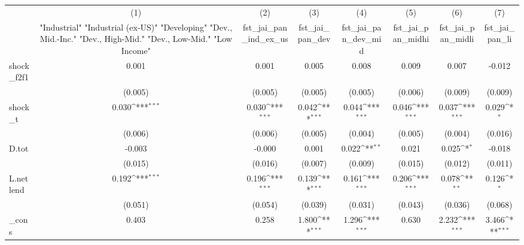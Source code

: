 {
\def\sym#1{\ifmmode^{#1}\else\(^{#1}\)\fi}
\begin{tabular}{l*{7}{c}}
\toprule
            &\multicolumn{1}{c}{(1)}&\multicolumn{1}{c}{(2)}&\multicolumn{1}{c}{(3)}&\multicolumn{1}{c}{(4)}&\multicolumn{1}{c}{(5)}&\multicolumn{1}{c}{(6)}&\multicolumn{1}{c}{(7)}\\
            &\multicolumn{1}{c}{ "Industrial" "Industrial (ex-US)" "Developing" "Dev., Mid.-Inc." "Dev., High-Mid."  "Dev., Low-Mid." "Low Income" }&\multicolumn{1}{c}{fst\_jai\_pan\_ind\_ex\_us}&\multicolumn{1}{c}{fst\_jai\_pan\_dev}&\multicolumn{1}{c}{fst\_jai\_pan\_dev\_mid}&\multicolumn{1}{c}{fst\_jai\_pan\_midhi}&\multicolumn{1}{c}{fst\_jai\_pan\_midli}&\multicolumn{1}{c}{fst\_jai\_pan\_li}\\
\midrule
shock\_f2f1  &       0.001         &       0.001         &       0.005         &       0.008         &       0.009         &       0.007         &      -0.012         \\
            &     (0.005)         &     (0.005)         &     (0.005)         &     (0.005)         &     (0.006)         &     (0.009)         &     (0.009)         \\
\addlinespace
shock\_t     &       0.030\sym{***}&       0.030\sym{***}&       0.042\sym{***}&       0.044\sym{***}&       0.046\sym{***}&       0.037\sym{***}&       0.029\sym{*}  \\
            &     (0.006)         &     (0.006)         &     (0.005)         &     (0.004)         &     (0.005)         &     (0.004)         &     (0.016)         \\
\addlinespace
D.tot       &      -0.003         &      -0.000         &       0.001         &       0.022\sym{**} &       0.021         &       0.025\sym{*}  &      -0.018         \\
            &     (0.015)         &     (0.016)         &     (0.007)         &     (0.009)         &     (0.015)         &     (0.012)         &     (0.011)         \\
\addlinespace
L.netlend   &       0.192\sym{***}&       0.196\sym{***}&       0.139\sym{***}&       0.161\sym{***}&       0.206\sym{***}&       0.078\sym{**} &       0.126\sym{*}  \\
            &     (0.051)         &     (0.054)         &     (0.039)         &     (0.031)         &     (0.043)         &     (0.036)         &     (0.068)         \\
\addlinespace
\_cons      &       0.403         &       0.258         &       1.800\sym{***}&       1.296\sym{***}&       0.630         &       2.232\sym{***}&       3.466\sym{***}\\

\end{tabular}}
